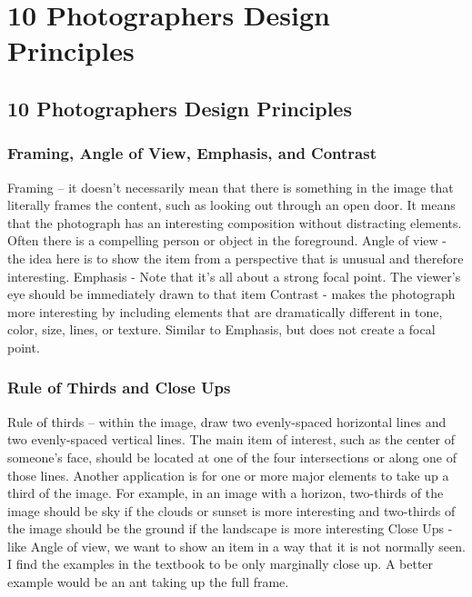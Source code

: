 \documentclass{beamer}
\begin{document}
		\section{10 Photographers Design Principles}
\subsection{10 Photographers Design Principles}		
\begin{frame}
	\frametitle{Framing, Angle of View, Emphasis, and Contrast}
	\begin{outline}
		\1 Framing – 
		\2 it doesn’t necessarily mean that there is something in the image that literally frames the content, such as looking out through an open door. It means that the photograph has an interesting composition without distracting elements. Often there is a compelling person or object in the foreground.
		\1 Angle of view - 
		\2 the idea here is to show the item from a perspective that is unusual and therefore interesting.
		\1 Emphasis - 
		\2 Note that it’s all about a strong focal point. The viewer’s eye should be immediately drawn to that item
				\1 Contrast - 
		\2 makes the photograph more interesting by including elements that are dramatically different in tone, color, size, lines, or texture. Similar to Emphasis, but does not create a focal point.
	\end{outline}
\end{frame}

\begin{frame}
	\frametitle{Rule of Thirds and Close Ups}
	\begin{outline}
		\1 Rule of thirds – 
		\2 within the image, draw two evenly-spaced horizontal lines and two evenly-spaced vertical lines. The main item of interest, such as the center of someone’s face, should be located at one of the four intersections or along one of those lines. Another application is for one or more major elements to take up a third of the image. For example, in an image with a horizon, two-thirds of the image should be sky if the clouds or sunset is more interesting and two-thirds of the image should be the ground if the landscape is more interesting
		\1 Close Ups - 
		\2 like Angle of view, we want to show an item in a way that it is not normally seen. I find the examples in the textbook to be only marginally close up. A better example would be an ant taking up the full frame.
	\end{outline}
\end{frame}
\end{document}
